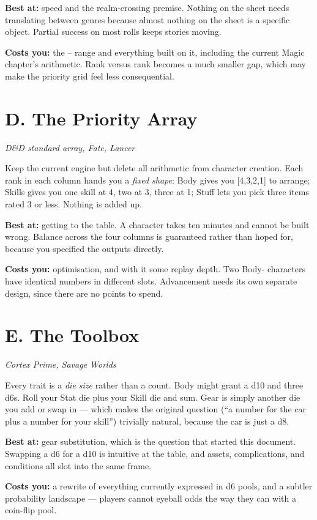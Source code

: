 \documentclass[11pt,oneside]{memoir}
\newcommand{\src}[1]{{\small\itshape\color{atrAccent2}#1}}
\begin{document}
\textbf{Best at:} speed and the realm-crossing premise. Nothing on the
sheet needs translating between genres because almost nothing on the sheet
is a specific object. Partial success on most rolls keeps stories moving.

\textbf{Costs you:} the -- range and everything built on
it, including the current Magic chapter's arithmetic. Rank 
versus rank  becomes a much smaller gap, which may make the
priority grid feel less consequential.

\section{D. The Priority Array}
\src{D\&D standard array, Fate, Lancer}

Keep the current engine but delete all arithmetic from character creation.
Each rank in each column hands you a \emph{fixed shape}: Body 
gives you [4,3,2,1] to arrange; Skills  gives you one skill at 4,
two at 3, three at 1; Stuff  lets you pick three items rated 3 or
less. Nothing is added up.

\textbf{Best at:} getting to the table. A character takes ten minutes and
cannot be built wrong. Balance across the four columns is guaranteed
rather than hoped for, because you specified the outputs directly.

\textbf{Costs you:} optimisation, and with it some replay depth. Two
Body- characters have identical numbers in different slots.
Advancement needs its own separate design, since there are no points to
spend.

\section{E. The Toolbox}
\src{Cortex Prime, Savage Worlds}

Every trait is a \emph{die size} rather than a count. Body 
might grant a d10 and three d6s. Roll your Stat die plus your Skill die
and sum. Gear is simply another die you add or swap in --- which makes the
original question (``a number for the car plus a number for your skill'')
trivially natural, because the car is just a d8.

\textbf{Best at:} gear substitution, which is the question that started
this document. Swapping a d6 for a d10 is intuitive at the table, and
assets, complications, and conditions all slot into the same frame.

\textbf{Costs you:} a rewrite of everything currently expressed in d6
pools, and a subtler probability landscape --- players cannot eyeball odds
the way they can with a coin-flip pool.
\end{document}
